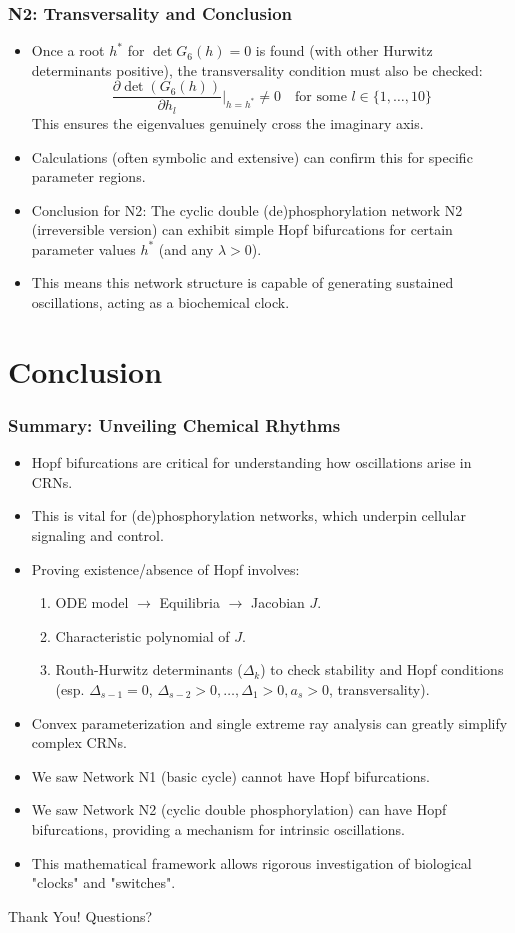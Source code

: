 \documentclass[aspectratio=169]{beamer}
\begin{document}
\begin{frame}{\insertsectionhead}
	\frametitle{N2: Transversality and Conclusion}
	\begin{itemize}
		\item Once a root $h^*$ for $\det G_6(h)=0$ is found (with other Hurwitz determinants positive), the transversality condition must also be checked:
			$$ \frac{\partial \det(G_6(h))}{\partial h_l} \bigg|_{h=h^*} \neq 0 \quad \text{for some } l \in \{1, \dots, 10\} $$
			This ensures the eigenvalues genuinely cross the imaginary axis.
		\item Calculations (often symbolic and extensive) can confirm this for specific parameter regions.
		\item \alert{Conclusion for N2}: The cyclic double (de)phosphorylation network N2 (irreversible version) \alert{can exhibit simple Hopf bifurcations} for certain parameter values $h^*$ (and any $\lambda > 0$).
		\item This means this network structure is capable of generating sustained oscillations, acting as a biochemical clock.
	\end{itemize}
\end{frame}

\section{Conclusion}

\begin{frame}{\insertsectionhead}
	\frametitle{Summary: Unveiling Chemical Rhythms}
	\begin{itemize}
		\item Hopf bifurcations are critical for understanding how \alert{oscillations} arise in CRNs.
		\item This is vital for (de)phosphorylation networks, which underpin cellular signaling and control.
		\item Proving existence/absence of Hopf involves:
			\begin{enumerate}
				\item ODE model $\to$ Equilibria $\to$ Jacobian $J$.
				\item Characteristic polynomial of $J$.
				\item Routh-Hurwitz determinants ($\Delta_k$) to check stability and Hopf conditions (esp. $\Delta_{s-1}=0$, $\Delta_{s-2}>0, \dots, \Delta_1>0, a_s>0$, transversality).
			\end{enumerate}
		\item \alert{Convex parameterization} and \alert{single extreme ray} analysis can greatly simplify complex CRNs.
		\item We saw Network N1 (basic cycle) \alert{cannot} have Hopf bifurcations.
		\item We saw Network N2 (cyclic double phosphorylation) \alert{can} have Hopf bifurcations, providing a mechanism for intrinsic oscillations.
		\item This mathematical framework allows rigorous investigation of biological "clocks" and "switches".
	\end{itemize}
\end{frame}

\begin{frame}[plain]
	\centering
	\vfill
	\Huge Thank You!
	\vfill
	Questions?
	\vfill
\end{frame}
\end{document}
